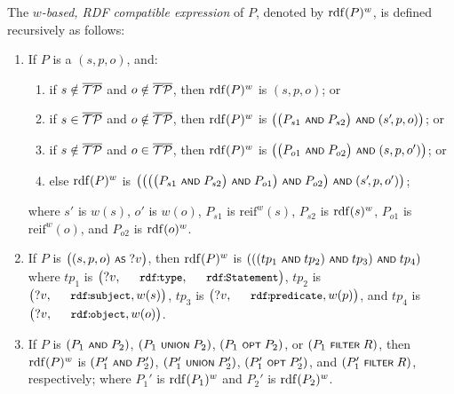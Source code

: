 The \emph{$w$-based, RDF compatible expression} of $P$, denoted by $\mathrm{rdf}(P)^{w}$, is defined recursively as follows:
\begin{enumerate}
	\item If $P$ is a {\TPplus} $(s,p,o)$, and:
		\begin{enumerate}
			\item if $s \notin \overline{\mathcal{TP}}$ and $o \notin \overline{\mathcal{TP}}$, then $\mathrm{rdf}(P)^w$ is $(s,p,o)$; or
			\item if $s \in \overline{\mathcal{TP}}$ and $o \notin \overline{\mathcal{TP}}$, then $\mathrm{rdf}(P)^w$ is $\bigl( \bigl( P_{s1} \text{ \normalfont\scriptsize\textsf{AND} } P_{s2} \bigr) \text{ \normalfont\scriptsize\textsf{AND} } (s'\!,p,o) \bigr)$; or
			\item if $s \notin \overline{\mathcal{TP}}$ and $o \in \overline{\mathcal{TP}}$, then $\mathrm{rdf}(P)^w$ is $\bigl( \bigl( P_{o1} \text{ \normalfont\scriptsize\textsf{AND} } P_{o2} \bigr) \text{ \normalfont\scriptsize\textsf{AND} } (s,p,o') \bigr)$; or
			\item else $\mathrm{rdf}(P)^w$ is $\bigl( \bigl( \bigl( \bigl( P_{s1} \text{ \normalfont\scriptsize\textsf{AND} } P_{s2} \bigr) \text{ \normalfont\scriptsize\textsf{AND} } P_{o1} \bigr) \text{ \normalfont\scriptsize\textsf{AND} } P_{o2} \bigr) \text{ \normalfont\scriptsize\textsf{AND} } (s'\!,p,o') \bigr)$;
		\end{enumerate}
		where $s'$ is $w(s)$, $o'$ is $w(o)$, $P_{s1}$ is $\mathrm{reif}^w(s)$, $P_{s2}$ is $\mathrm{rdf}(s)^w$, $P_{o1}$ is $\mathrm{reif}^w(o)$, and $P_{o2}$ is $\mathrm{rdf}(o)^w$.
		\vspace{1ex}

	\item If $P$ is
			$\bigl( (s,p,o) \text{ \normalfont\scriptsize\textsf{AS} } ?v \bigr)$,
		then $\mathrm{rdf}(P)^w$ is $( ( ( tp_1 \text{ \normalfont\scriptsize\textsf{AND} } tp_2 ) \text{ \normalfont\scriptsize\textsf{AND} } tp_3 ) \text{ \normalfont\scriptsize\textsf{AND} } tp_4 )$ where $tp_1$ is $\bigl(?v,\mathTinyRDF{rdf\!:\!type},\mathTinyRDF{rdf\!:\!Statement}\bigr)$, $tp_2$ is $\bigl(?v,\mathTinyRDF{rdf\!:\!subject},w(s)\bigr)$, $tp_3$ is $\bigl(?v,\mathTinyRDF{rdf\!:\!predicate},w(p)\bigr)$, and $tp_4$ is $\bigl(?v,\mathTinyRDF{rdf\!:\!object},w(o)\bigr)$.


		\vspace{1ex}
	\item If $P$ is $(P_1 \text{ \normalfont\scriptsize\textsf{AND} } P_2)$, $(P_1 \text{ \normalfont\scriptsize\textsf{UNION} } P_2)$, $(P_1 \text{ \normalfont\scriptsize\textsf{OPT} } P_2)$, or $(P_1 \text{ \normalfont\scriptsize\textsf{FILTER} } R)$, then $\mathrm{rdf}(P)^w$ is $(P_1' \text{ \normalfont\scriptsize\textsf{AND} } P_2')$, $(P_1' \text{ \normalfont\scriptsize\textsf{UNION} } P_2')$, $(P_1' \text{ \normalfont\scriptsize\textsf{OPT} } P_2')$, and $(P_1' \text{ \normalfont\scriptsize\textsf{FILTER} } R)$, respectively; where $P_1'$ is $\mathrm{rdf}(P_1)^w$ and $P_2'$ is $\mathrm{rdf}(P_2)^w$.


\end{enumerate}
